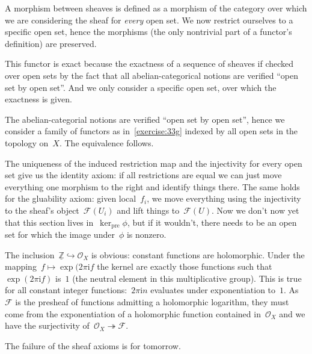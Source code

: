 \begin{exercise}
  \label{exercise:33g}
  A morphism between sheaves is defined as a morphism of the category over which we are considering the sheaf for \emph{every} open set. We now restrict ourselves to a specific open set, hence the morphisms (the only nontrivial part of a functor's definition) are preserved. 

  This functor is exact because the exactness of a sequence of sheaves if checked over open sets by the fact that all abelian-categorical notions are verified ``open set by open set''. And we only consider a specific open set, over which the exactness is given.
\end{exercise}

\begin{exercise}
  The abelian-categorial notions are verified ``open set by open set'', hence we consider a family of functors as in~\autoref{exercise:33g} indexed by all open sets in the topology on~$X$. The equivalence follows.
\end{exercise}

\begin{exercise} %
  The uniqueness of the induced restriction map and the injectivity for every open set give us the identity axiom: if all restrictions are equal we can just move everything one morphism to the right and identify things there. The same holds for the gluability axiom: given local~$f_i$, we move everything using the injectivity to the sheaf's object~$\mathcal{F}(U_i)$ and lift things to~$\mathcal{F}(U)$. Now we don't now yet that this section lives in~$\ker_{\textrm{pre}}\phi$, but if it wouldn't, there needs to be an open set for which the image under~$\phi$ is nonzero. %
\end{exercise}

\begin{exercise} %
  The inclusion~$\underline{\mathbb{Z}}\hookrightarrow\mathcal{O}_X$ is obvious: constant functions are holomorphic. Under the mapping~$f\mapsto\exp(2\pi\mathrm{i}f$ the kernel are exactly those functions such that~$\exp(2\pi\mathrm{i}f)$ is~$1$ (the neutral element in this multiplicative group). This is true for all constant integer functions:~$2\pi\mathrm{i}n$ evaluates under exponentiation to~$1$. As~$\mathcal{F}$ is the presheaf of functions admitting a holomorphic logarithm, they must come from the exponentiation of a holomorphic function contained in~$\mathcal{O}_X$ and we have the surjectivity of~$\mathcal{O}_X\twoheadrightarrow\mathcal{F}$.

  The failure of the sheaf axioms is for tomorrow.
\end{exercise}



